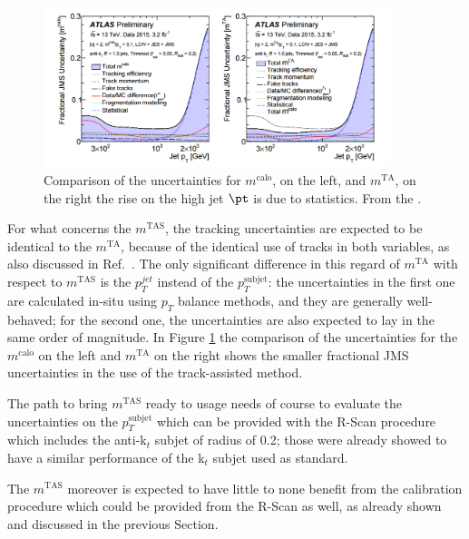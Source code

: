 \documentclass[UKenglish,texlive=2013]{\ATLASLATEXPATH atlasdoc}
\newcommand{\mta}{\ensuremath{m^\textrm{TA}}\xspace}
\newcommand{\mtas}{\ensuremath{m^\textrm{TAS}}\xspace}
\newcommand{\mcal}{\ensuremath{m^\textrm{calo}}\xspace}
\begin{document}
\begin{figure}[!ht]
  \centering
      \includegraphics[width=0.9\textwidth]{jet_part/uncert.png}
  \caption[Comparison of the uncertainties for $\mcal$ and $\mta$]{Comparison of the uncertainties for $\mcal$, on the left, and $\mta$, on the right the rise on the high jet $\pt$ is due to statistics. From the \cite{art35}.}
  \label{fig:uncert}
\end{figure}


For what concerns the $\mtas$, the tracking uncertainties are expected to be identical to the $\mta$, because of the identical use of tracks in both variables, as also discussed in Ref.~\cite{art35}.
The only significant difference in this regard of $\mta$ with respect to $\mtas$ is the $p_T^{jet}$ instead of the $p_T^\textrm{subjet}$: the uncertainties in the first one are calculated in-situ using $p_T$ balance methods, and they are generally well-behaved; for the second one, the uncertainties are also expected to lay in the same order of magnitude. In Figure \ref{fig:uncert} the comparison of the uncertainties for the $\mcal$ on the left and $\mta$ on the right shows the smaller fractional JMS uncertainties in the use of the track-assisted method.

The path to bring $\mtas$ ready to usage needs of course to evaluate the uncertainties on the  $p_T^\textrm{subjet}$ which can be provided with the R-Scan procedure which includes the anti-k$_t$ subjet of radius of 0.2; those were already showed to have a similar performance of the k$_t$ subjet used as standard.

The $\mtas$ moreover is expected to have little to none benefit from the calibration procedure which could be provided from the R-Scan as well, as already shown and discussed in the previous Section. 





\clearpage
\end{document}
